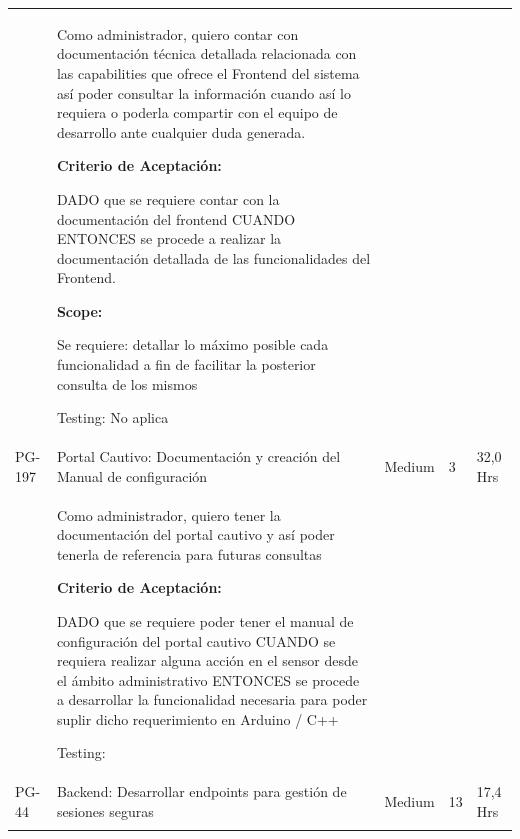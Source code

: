 \documentclass[11pt]{charter}
\begin{document}
\begin{landscape}
\begin{tabularx}{\linewidth}{@{}|p{1.3cm}|p{17cm}|p{1.7cm}|p{1.5cm}|p{1.7cm}|@{}}
         &  \begin{description}
                   \item Como administrador, quiero   contar con documentación técnica detallada relacionada con las capabilities   que ofrece el Frontend del sistema así poder consultar la información cuando   así lo requiera o poderla compartir con el equipo de desarrollo ante cualquier   duda generada.                 
                   \item \textbf{Criterio de Aceptación:}
                   \item DADO que se requiere contar con la documentación del frontend CUANDO       ENTONCES se procede a realizar la documentación detallada de las   funcionalidades del Frontend.                
                   \item \textbf{Scope:}
                         \item Se requiere: detallar lo máximo posible cada funcionalidad a fin de   facilitar la posterior consulta de los mismos                 
                   \item Testing: No aplica
            \end{description}  &  &     & \\
PG-197   & Portal Cautivo: Documentación y   creación del Manual de configuración               & Medium             & 3   & 32,0  Hrs         \\
         &  \begin{description}
                   \item Como administrador, quiero tener   la documentación del portal cautivo y así poder tenerla de referencia para   futuras consultas                 
                   \item \textbf{Criterio de Aceptación:}
                   \item DADO que se requiere poder tener el manual de configuración del portal cautivo CUANDO se requiera realizar alguna acción en el sensor desde el ámbito   administrativo ENTONCES se procede a desarrollar la funcionalidad necesaria para poder   suplir dicho requerimiento en Arduino / C++                
                   \item Testing:
            \end{description}   &  &     & \\
PG-44    & Backend: Desarrollar endpoints   para gestión de sesiones seguras  & Medium             & 13  & 17,4  Hrs         \\
         &  \begin{description}                 

\end{description}
\end{tabularx}
\end{landscape}
\end{document}
